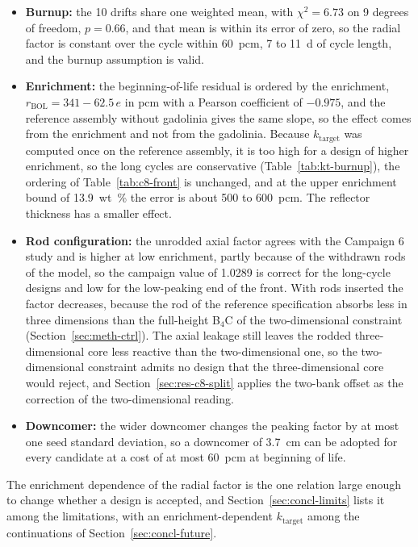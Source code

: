 \begin{itemize}
  \item \textbf{Burnup:} the 10 drifts share one weighted mean, with
        $\chi^2 = 6.73$ on 9 degrees of freedom, $p = 0.66$, and that
        mean is within its error of zero, so the radial factor is
        constant over the cycle within \SI{60}{pcm}, 7 to \SI{11}{d} of
        cycle length, and the burnup assumption is valid.
  \item \textbf{Enrichment:} the beginning-of-life residual is ordered
        by the enrichment, $r_\mathrm{BOL} = 341 - 62.5\,e$ in pcm with a
        Pearson coefficient of $-0.975$, and the reference assembly
        without gadolinia gives the same slope, so the effect comes from
        the enrichment and not from the gadolinia. Because
        $k_\mathrm{target}$ was computed once on the reference assembly,
        it is too high for a design of higher enrichment, so the long
        cycles are conservative (Table~\ref{tab:kt-burnup}), the
        ordering of Table~\ref{tab:c8-front} is unchanged, and at the
        upper enrichment bound of \SI{13.9}{wt\%} the error is about 500
        to \SI{600}{pcm}. The reflector thickness has a smaller effect.
  \item \textbf{Rod configuration:} the unrodded axial factor agrees
        with the Campaign 6 study and is higher at low enrichment, partly
        because of the withdrawn rods of the model, so the campaign value
        of 1.0289 is correct for the long-cycle designs and low for the
        low-peaking end of the front. With rods inserted the factor
        decreases, because the rod of the reference specification absorbs
        less in three dimensions than the full-height B$_4$C of the
        two-dimensional constraint (Section~\ref{sec:meth-ctrl}). The
        axial leakage still leaves the rodded three-dimensional core less
        reactive than the two-dimensional one, so the two-dimensional
        constraint admits no design that the three-dimensional core
        would reject, and Section~\ref{sec:res-c8-split} applies the
        two-bank offset as the correction of the two-dimensional reading.
  \item \textbf{Downcomer:} the wider downcomer changes the peaking
        factor by at most one seed standard deviation, so a downcomer of
        \SI{3.7}{cm} can be adopted for every candidate at a cost of at
        most \SI{60}{pcm} at beginning of life.
\end{itemize}

The enrichment dependence of the radial factor is the one relation
large enough to change whether a design is accepted, and
Section~\ref{sec:concl-limits} lists it among the limitations, with an
enrichment-dependent $k_\mathrm{target}$ among the continuations of
Section~\ref{sec:concl-future}.

